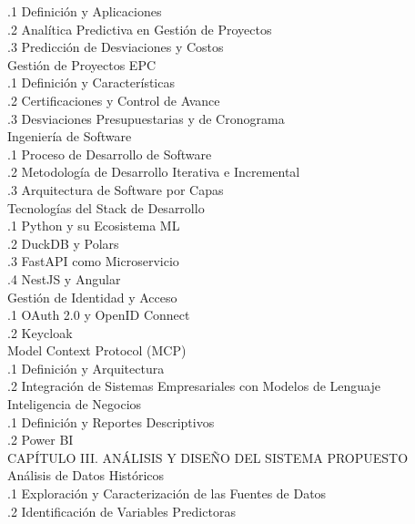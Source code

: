 \documentclass{univalle-perfil}
\begin{document}
\begin{indicetentativo}
\quad{}.1 Definición y Aplicaciones \\
\quad{}.2 Analítica Predictiva en Gestión de Proyectos \\
\quad{}.3 Predicción de Desviaciones y Costos \\
 Gestión de Proyectos EPC \\
\quad{}.1 Definición y Características \\
\quad{}.2 Certificaciones y Control de Avance \\
\quad{}.3 Desviaciones Presupuestarias y de Cronograma \\
 Ingeniería de Software \\
\quad{}.1 Proceso de Desarrollo de Software \\
\quad{}.2 Metodología de Desarrollo Iterativa e Incremental \\
\quad{}.3 Arquitectura de Software por Capas \\
 Tecnologías del Stack de Desarrollo \\
\quad{}.1 Python y su Ecosistema ML \\
\quad{}.2 DuckDB y Polars \\
\quad{}.3 FastAPI como Microservicio \\
\quad{}.4 NestJS y Angular \\
 Gestión de Identidad y Acceso \\
\quad{}.1 OAuth 2.0 y OpenID Connect \\
\quad{}.2 Keycloak \\
 Model Context Protocol (MCP) \\
\quad{}.1 Definición y Arquitectura \\
\quad{}.2 Integración de Sistemas Empresariales con Modelos de Lenguaje \\
 Inteligencia de Negocios \\
\quad{}.1 Definición y Reportes Descriptivos \\
\quad{}.2 Power BI \\[2pt]
CAPÍTULO III. ANÁLISIS Y DISEÑO DEL SISTEMA PROPUESTO \\
 Análisis de Datos Históricos \\
\quad{}.1 Exploración y Caracterización de las Fuentes de Datos \\
\quad{}.2 Identificación de Variables Predictoras \\

\end{indicetentativo}
\end{document}
